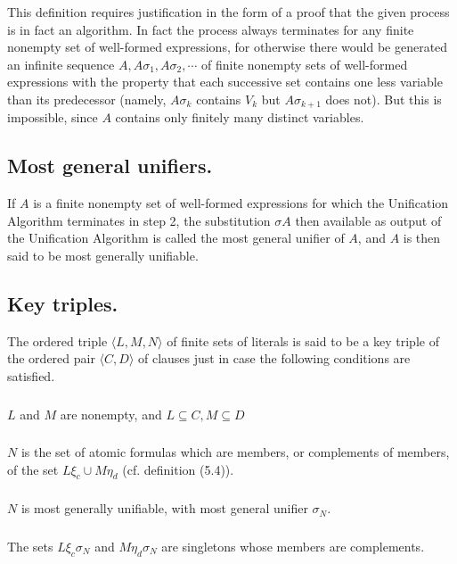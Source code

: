 \documentclass[8pt]{extarticle}
\begin{document}
This definition requires justification in the form of a proof that the given
process is in fact an algorithm. In fact the process always terminates for any
finite nonempty set of well-formed expressions, for otherwise there would be
generated an infinite sequence $A, A\sigma_1,A\sigma_2,\dotsm$ of finite nonempty sets of well-formed expressions with the property that each successive set contains one less variable than its predecessor (namely, $A\sigma_k$ contains $V_k$ but $A\sigma_{k+1}$ does not). But this is impossible, since $A$ contains only finitely many distinct variables.

\subsection{Most general unifiers.}
If $A$ is a finite nonempty set of well-formed expressions for which the Unification Algorithm terminates in step 2, the substitution $\sigma A$ then available as output of the Unification Algorithm is called the most
general unifier of $A$, and $A$ is then said to be most generally unifiable.

\subsection{Key triples.}
The ordered triple $\langle L, M, N \rangle$ of finite sets of literals is said
to be a key triple of the ordered pair $\langle C,D\rangle$ of clauses just in case the following conditions are satisfied.

\subsubsection{}
$L$ and $M$ are nonempty, and $L \subseteq C, M \subseteq D$
\subsubsection{}
$N$ is the set of atomic formulas which are members, or complements
of members, of the set $L\xi_c\cup M\eta_d$ (cf. definition (5.4)).
\subsubsection{}
$N$ is most generally unifiable, with most general unifier $\sigma _N$.
\subsubsection{}
The sets $L\xi_c\sigma_N$ and $M\eta_d\sigma_N$ are singletons whose members are complements.
\end{document}
